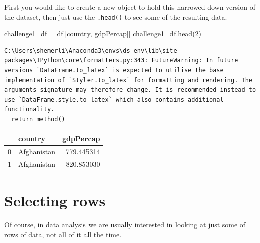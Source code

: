 \documentclass[
  letterpaper,
  DIV=11,
  numbers=noendperiod]{scrreprt}
\newenvironment{Shaded}{\begin{snugshade}}{\end{snugshade}}
\newcommand{\DecValTok}[1]{\textcolor[rgb]{0.68,0.00,0.00}{#1}}
\newcommand{\NormalTok}[1]{\textcolor[rgb]{0.00,0.23,0.31}{#1}}
\newcommand{\OperatorTok}[1]{\textcolor[rgb]{0.37,0.37,0.37}{#1}}
\newcommand{\StringTok}[1]{\textcolor[rgb]{0.13,0.47,0.30}{#1}}
\begin{document}
\begin{tcolorbox}[enhanced jigsaw, colframe=quarto-callout-note-color-frame, toprule=.15mm, colback=white, leftrule=.75mm, rightrule=.15mm, breakable, colbacktitle=quarto-callout-note-color!10!white, arc=.35mm, bottomtitle=1mm, bottomrule=.15mm, titlerule=0mm, title={Solution to Challenge 1}, toptitle=1mm, left=2mm, opacityback=0, coltitle=black, opacitybacktitle=0.6]

First you would like to create a new object to hold this narrowed down
version of the dataset, then just use the \texttt{.head()} to see some
of the resulting data.

\begin{Shaded}
\begin{Highlighting}[]
\NormalTok{challenge1\_df }\OperatorTok{=}\NormalTok{ df[[}\StringTok{\textquotesingle{}country\textquotesingle{}}\NormalTok{, }\StringTok{\textquotesingle{}gdpPercap\textquotesingle{}}\NormalTok{]]}
\NormalTok{challenge1\_df.head(}\DecValTok{2}\NormalTok{)}
\end{Highlighting}
\end{Shaded}

\begin{verbatim}
C:\Users\shemerli\Anaconda3\envs\ds-env\lib\site-packages\IPython\core\formatters.py:343: FutureWarning: In future versions `DataFrame.to_latex` is expected to utilise the base implementation of `Styler.to_latex` for formatting and rendering. The arguments signature may therefore change. It is recommended instead to use `DataFrame.style.to_latex` which also contains additional functionality.
  return method()
\end{verbatim}

\begin{tabular}{llr}
\toprule
{} &      country &   gdpPercap \\
\midrule
0 &  Afghanistan &  779.445314 \\
1 &  Afghanistan &  820.853030 \\
\bottomrule
\end{tabular}

\end{tcolorbox}

\hypertarget{selecting-rows}{%
\section{Selecting rows}\label{selecting-rows}}

Of course, in data analysis we are usually interested in looking at just
some of rows of data, not all of it all the time.
\end{document}
